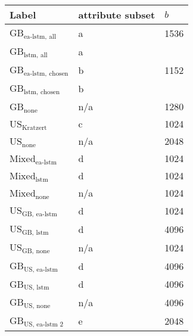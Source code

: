 \begin{tabular}{lll}
    \toprule
    Label & attribute subset & $b$ \\
    \midrule
    GB$_\text{ea-lstm, all}$ & a &  1536 \\
    GB$_\text{lstm, all}$ & a &  \\
    GB$_\text{ea-lstm, chosen}$ & b & 1152 \\
    GB$_\text{lstm, chosen}$ & b &  \\
    GB$_\text{none}$ & n/a & 1280 \\
    US$_\text{Kratzert}$  & c & 1024 \\
    US$_\text{none}$  & n/a & 2048 \\
    Mixed$_\text{ea-lstm}$ & d & 1024 \\
    Mixed$_\text{lstm}$ & d & 1024 \\
    Mixed$_\text{none}$ & n/a & 1024 \\
    US$_\text{GB, ea-lstm}$ & d  & 1024 \\
    US$_\text{GB, lstm}$ & d  & 4096 \\
    US$_\text{GB, none}$ & n/a & 1024 \\
    GB$_\text{US, ea-lstm}$ & d & 4096 \\
    GB$_\text{US, lstm}$  & d & 4096 \\ 
    GB$_\text{US, none}$  & n/a & 4096 \\
    GB$_\text{US, ea-lstm 2}$ & e & 2048 \\

\end{tabular}
